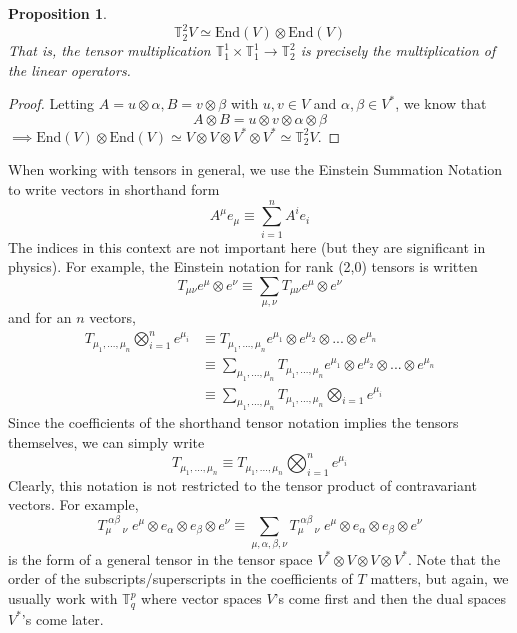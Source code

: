 \documentclass{article}
\newtheorem{proposition}[theorem]{Proposition}
\theoremstyle{remark}
\theoremstyle{definition}
\begin{document}
    \begin{proposition}
    \[\mathbb{T}^2_2 V \simeq \text{End}(V) \otimes \text{End}(V)\]
    That is, the tensor multiplication $\mathbb{T}^1_1 \times \mathbb{T}^1_1 \longrightarrow \mathbb{T}^2_2$ is precisely the multiplication of the linear operators. 
    \end{proposition}
    \begin{proof}
    Letting $A = u \otimes \alpha, B = v \otimes \beta$ with $u, v \in V$ and $\alpha, \beta \in V^*$, we know that
    \[A \otimes B = u \otimes v \otimes \alpha \otimes \beta\]
    $\implies \text{End}(V) \otimes \text{End}(V) \simeq V \otimes V \otimes V^* \otimes V^* \simeq \mathbb{T}^2_2 V$. 
    \end{proof}

    When working with tensors in general, we use the Einstein Summation Notation to write vectors in shorthand form
    \[ A^{\mu} e_{\mu} \equiv \sum_{i=1}^{n} A^{i} e_{i}\]
    The indices in this context are not important here (but they are significant in physics). For example, the Einstein notation for rank (2,0) tensors is written
    \[ T_{\mu \nu} e^{\mu} \otimes e^{\nu} \equiv \sum_{\mu, \nu} T_{\mu \nu} e^{\mu} \otimes e^{\nu}\]
    and for an $n$ vectors, 
    \begin{align*}
    T_{\mu_{1}, ..., \mu_{n}} \bigotimes_{i=1}^{n} e^{\mu_{i}} & \equiv T_{\mu_{1}, ..., \mu_{n}} e^{\mu_{1}} \otimes e^{\mu_{2}} \otimes ... \otimes e^{\mu_{n}} \\
         & \equiv \sum_{\mu_{1}, ..., \mu_{n}} T_{\mu_{1}, ..., \mu_{n}} e^{\mu_{1}} \otimes e^{\mu_{2}} \otimes ... \otimes e^{\mu_{n}} \\
         & \equiv \sum_{\mu_{1}, ..., \mu_{n}} T_{\mu_{1}, ..., \mu_{n}} \bigotimes_{i=1} e^{\mu_{i}}
    \end{align*}
    Since the coefficients of the shorthand tensor notation implies the tensors themselves, we can simply write
    \[ T_{\mu_{1}, ..., \mu_{n}} \equiv T_{\mu_{1}, ..., \mu_{n}} \bigotimes_{i=1}^{n} e^{\mu_{i}} \]
    Clearly, this notation is not restricted to the tensor product of contravariant vectors. For example,
    \[T_{\mu \;\;\;\;\nu}^{\; \alpha \beta} \; e^{\mu} \otimes e_{\alpha} \otimes e_{\beta} \otimes e^{\nu}  \equiv \sum_{\mu, \alpha, \beta, \nu} T_{\mu \;\;\;\; \nu}^{\; \alpha \beta} \; e^{\mu} \otimes e_{\alpha} \otimes e_{\beta} \otimes e^{\nu}\]
    is the form of a general tensor in the tensor space $V^* \otimes V \otimes V \otimes V^*$. Note that the order of the subscripts/superscripts in the coefficients of $T$ matters, but again, we usually work with $\mathbb{T}^p_q$ where vector spaces $V$'s come first and then the dual spaces $V^*$'s come later. 
\end{document}

